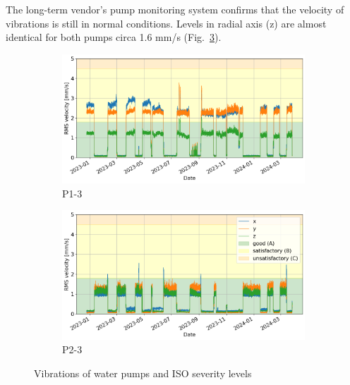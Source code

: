 \documentclass{llncs}
\begin{document}
The long-term vendor's pump monitoring system confirms that the velocity of vibrations is still in normal conditions. Levels in radial axis (z) are almost identical for both pumps circa 1.6 mm/s (Fig.~\ref{fig:ksb-rms}).

\begin{figure}
     \begin{subfigure}[b]{0.48\textwidth}
         \centering
         \includegraphics[width=\textwidth]{fig/ksb-cloud/P1-rms-vibration.png}
         \caption{P1-3}
         \label{fig:P1-ksb-rms}
     \end{subfigure}
     \hfill
     \begin{subfigure}[b]{0.48\textwidth}
         \centering
         \includegraphics[width=\textwidth]{fig/ksb-cloud/P2-rms-vibration.png}
         \caption{P2-3}
         \label{fig:P2-ksb-rms}
     \end{subfigure}
     \caption{Vibrations of water pumps and ISO severity levels}
     \label{fig:ksb-rms}
\end{figure}
\end{document}

